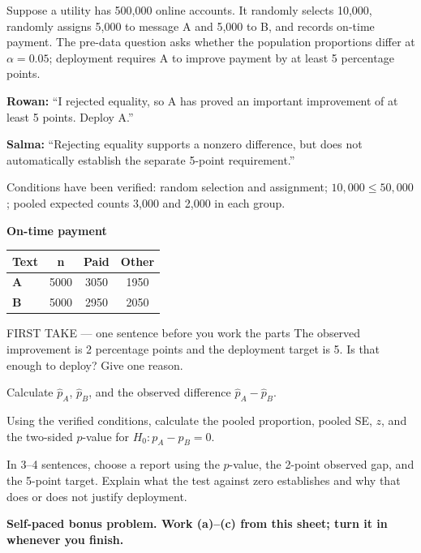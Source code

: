 \documentclass[14pt]{extarticle}
\begin{document}
\pagestyle{empty}


\noindent\begin{minipage}[t]{0.57\linewidth}
\vspace{0pt}
Suppose a utility has 500,000 online accounts. It randomly selects 10,000, randomly assigns 5,000 to message A and 5,000 to B, and records on-time payment. The pre-data question asks whether the population proportions differ at $\alpha=0.05$; deployment requires A to improve payment by at least 5 percentage points.\par\smallskip \textbf{Rowan:} ``I rejected equality, so A has proved an important improvement of at least 5 points. Deploy A.''\par \textbf{Salma:} ``Rejecting equality supports a nonzero difference, but does not automatically establish the separate 5-point requirement.''\par\smallskip Conditions have been verified: random selection and assignment; $10{,}000\leq50{,}000$; pooled expected counts 3,000 and 2,000 in each group.\par
\end{minipage}\hfill
\begin{minipage}[t]{0.40\linewidth}
\vspace{0pt}
\begin{center}
\textbf{On-time payment}\par\smallskip
\begin{tabular}{|l|c|c|c|}
\hline
\textbf{Text} & \textbf{n} & \textbf{Paid} & \textbf{Other} \\ \hline
\textbf{A} & 5000 & 3050 & 1950 \\ \hline
\textbf{B} & 5000 & 2950 & 2050 \\ \hline
\end{tabular}
\end{center}
\end{minipage}

\begin{firsttakebox}{FIRST TAKE --- one sentence before you work the parts}
The observed improvement is 2 percentage points and the deployment target is 5. Is that enough to deploy? Give one reason.
\end{firsttakebox}

\begin{description}[leftmargin=1.15in, labelwidth=1in, itemsep=2pt, topsep=2pt]
  \item[\dokbadge{1}~(a)] Calculate $\hat p_A$, $\hat p_B$, and the observed difference $\hat p_A-\hat p_B$.
  \item[\dokbadge{2}~(b)] Using the verified conditions, calculate the pooled proportion, pooled SE, $z$, and the two-sided $p$-value for $H_0:p_A-p_B=0$.
  \item[\dokbadge{3}~(c)] In 3--4 sentences, choose a report using the $p$-value, the 2-point observed gap, and the 5-point target. Explain what the test against zero establishes and why that does or does not justify deployment.
\end{description}

\vfill
\textbf{Self-paced bonus problem. Work (a)--(c) from this sheet; turn it in whenever you finish.}
\end{document}

